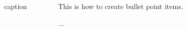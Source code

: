 \documentclass[20pt, a0paper, portrait, margin=15mm, innermargin=15mm,
     blockverticalspace=15mm, colspace=15mm, subcolspace=8mm]{tikzposter} %
\newcommand{\plot}[3]{
\begin{figure}[H]
    \centering
    \scriptsize
    \scalebox{1.3}{}
    \caption{\footnotesize{#2}}
    \label{#3}
\end{figure}
}
\begin{document}
\begin{columns}
{\begin{minipage}[t]{20cm}
                    \plot{figures/line_xhel_scaling_128}
						{caption}
						{xhel_scaling}

                    \begin{itemsposter}
                    \item
                        This is how to create bullet point items.
                    \item
                        ...
                    \end{itemsposter}
                
            \end{minipage}
         
        }
	
	\end{columns}
	
\end{document}
